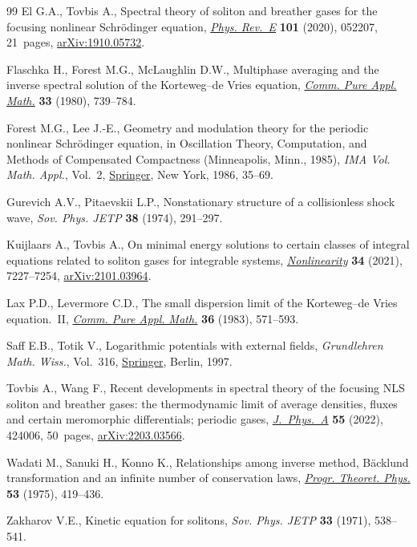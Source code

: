 \documentclass[10pt,a4paper]{amsart}
\providecommand{\LastPageEnding}{}
\numberwithin{equation}{section}
\begin{document}
\begin{thebibliography}{99}
El G.A., Tovbis A., Spectral theory of soliton and breather gases for the
 focusing nonlinear {S}chr\"odinger equation, \href{https://doi.org/10.1103/PhysRevE.101.052207}{\textit{Phys. Rev.~E}}
 \textbf{101} (2020), 052207, 21~pages, \href{https://arxiv.org/abs/1910.05732}{arXiv:1910.05732}.

Flaschka H., Forest M.G., McLaughlin D.W., Multiphase averaging and the inverse
 spectral solution of the {K}orteweg--de {V}ries equation, \href{https://doi.org/10.1002/cpa.3160330605}{\textit{Comm. Pure
 Appl. Math.}} \textbf{33} (1980), 739--784.

Forest M.G., Lee J.-E., Geometry and modulation theory for the periodic
 nonlinear {S}chr\"odinger equation, in Oscillation Theory, Computation, and
 Methods of Compensated Compactness ({M}inneapolis, {M}inn., 1985),
 \textit{IMA Vol. Math. Appl.}, Vol.~2, \href{https://doi.org/10.1007/978-1-4613-8689-6_3}{Springer}, New York, 1986, 35--69.

Gurevich A.V., Pitaevskii L.P., Nonstationary structure of a collisionless
 shock wave, \textit{Sov. Phys. JETP} \textbf{38} (1974), 291--297.

Kuijlaars A., Tovbis A., On minimal energy solutions to certain classes of
 integral equations related to soliton gases for integrable systems,
 \href{https://doi.org/10.1088/1361-6544/ac20a5}{\textit{Nonlinearity}} \textbf{34} (2021), 7227--7254, \href{https://arxiv.org/abs/2101.03964}{arXiv:2101.03964}.

Lax P.D., Levermore C.D., The small dispersion limit of the {K}orteweg--de
 {V}ries equation.~{II}, \href{https://doi.org/10.1002/cpa.3160360503}{\textit{Comm. Pure Appl. Math.}} \textbf{36} (1983),
 571--593.

Saff E.B., Totik V., Logarithmic potentials with external fields,
 \textit{Grundlehren Math. Wiss.}, Vol.~316, \href{https://doi.org/10.1007/978-3-662-03329-6}{Springer}, Berlin, 1997.

Tovbis A., Wang F., Recent developments in spectral theory of the focusing
 {NLS} soliton and breather gases: the thermodynamic limit of average
 densities, fluxes and certain meromorphic differentials; periodic gases,
 \href{https://doi.org/10.1088/1751-8121/ac97d0}{\textit{J.~Phys.~A}} \textbf{55} (2022), 424006, 50~pages,
 \href{https://arxiv.org/abs/2203.03566}{arXiv:2203.03566}.

Wadati M., Sanuki H., Konno K., Relationships among inverse method,
 {B}\"acklund transformation and an infinite number of conservation laws,
 \href{https://doi.org/10.1143/PTP.53.419}{\textit{Progr. Theoret. Phys.}} \textbf{53} (1975), 419--436.

Zakharov V.E., Kinetic equation for solitons, \textit{Sov. Phys. JETP}
 \textbf{33} (1971), 538--541.

\end{thebibliography}\LastPageEnding
\end{document}
